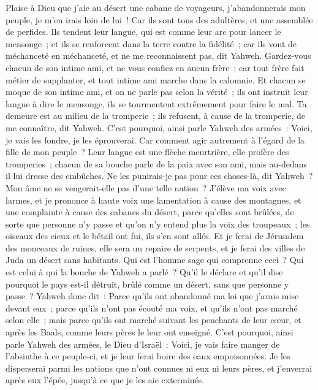 \begin{multicols}{2}
Plaise à Dieu que j'aie au désert une cabane de voyageurs, j'abandonnerais mon peuple, je m'en irais loin de lui~! Car ils sont tous des adultères, et une assemblée de perfides.
Ils tendent leur langue, qui est comme leur arc pour lancer le mensonge~; et ils se renforcent dans la terre contre la fidélité~; car ils vont de méchanceté en méchanceté, et ne me reconnaissent pas, dit Yahweh.
Gardez-vous chacun de son intime ami, et ne vous confiez en aucun frère~; car tout frère fait métier de supplanter, et tout intime ami marche dans la calomnie.
Et chacun se moque de son intime ami, et on ne parle pas selon la vérité~; ils ont instruit leur langue à dire le mensonge, ils se tourmentent extrêmement pour faire le mal.
Ta demeure est au milieu de la tromperie~; ils refusent, à cause de la tromperie, de me connaître, dit Yahweh.
C'est pourquoi, ainsi parle Yahweh des armées~: Voici, je vais les fondre, je les éprouverai. Car comment agir autrement à l'égard de la fille de mon peuple~?
Leur langue est une flèche meurtrière, elle profère des tromperies~; chacun de sa bouche parle de la paix avec son ami, mais au-dedans il lui dresse des embûches.
Ne les punirais-je pas pour ces choses-là, dit Yahweh~? Mon âme ne se vengerait-elle pas d'une telle nation~?
J'élève ma voix avec larmes, et je prononce à haute voix une lamentation à cause des montagnes, et une complainte à cause des cabanes du désert, parce qu'elles sont brûlées, de sorte que personne n'y passe et qu'on n'y entend plus la voix des troupeaux~; les oiseaux des cieux et le bétail ont fui, ils s'en sont allés.
Et je ferai de Jérusalem des monceaux de ruines, elle sera un repaire de serpents, et je ferai des villes de Juda un désert sans habitants.
Qui est l'homme sage qui comprenne ceci~? Qui est celui à qui la bouche de Yahweh a parlé~? Qu'il le déclare et qu'il dise pourquoi le pays est-il détruit, brûlé comme un désert, sans que personne y passe~?
Yahweh donc dit~: Parce qu'ils ont abandonné ma loi que j'avais mise devant eux~; parce qu'ils n'ont pas écouté ma voix, et qu'ils n'ont pas marché selon elle~;
mais parce qu'ils ont marché suivant les penchants de leur cœur, et après les Baals, comme leurs pères le leur ont enseigné.
C'est pourquoi, ainsi parle Yahweh des armées, le Dieu d'Israël~: Voici, je vais faire manger de l'absinthe à ce peuple-ci, et je leur ferai boire des eaux empoisonnées.
Je les disperserai parmi les nations que n'ont connues ni eux ni leurs pères, et j'enverrai après eux l'épée, jusqu'à ce que je les aie exterminés.

\end{multicols}
